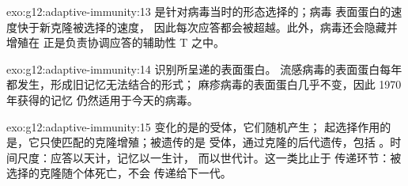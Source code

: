 \begin{solution}{exo:g12:adaptive-immunity:13}
是针对病毒当时的形态选择的；病毒
表面蛋白的速度快于新克隆被选择的速度，
因此每次应答都会被超越。此外，病毒还会隐藏并增殖在
正是负责协调应答的辅助性 T 之中。
\end{solution}

\begin{solution}{exo:g12:adaptive-immunity:14}
识别所呈递的表面蛋白。
流感病毒的表面蛋白每年都发生，形成旧记忆无法结合的形式；
麻疹病毒的表面蛋白几乎不变，因此 1970 年获得的记忆
仍然适用于今天的病毒。
\end{solution}

\begin{solution}{exo:g12:adaptive-immunity:15}
变化的是的受体，它们随机产生；
起选择作用的是，它只使匹配的克隆增殖；被遗传的是
受体，通过克隆的后代遗传，包括
。时间尺度：应答以天计，记忆以一生计，
而以世代计。这一类比止于
传递环节：被选择的克隆随个体死亡，不会
传递给下一代。
\end{solution}


